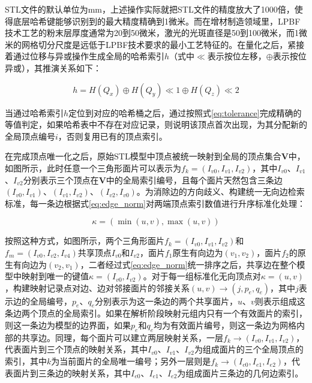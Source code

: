 STL文件的默认单位为$\mathrm{mm}$，上述操作实际就把STL文件的精度放大了\num{1000}倍，使得底层哈希键能够识别到的最大精度精确到1微米。而在增材制造领域里，LPBF技术工艺的粉末层厚度通常为20到\num{50}微米，激光的光斑直径是50到\num{100}微米，而1微米的网格切分尺度是远低于LPBF技术要求的最小工艺特征的。在量化之后，紧接着通过位移与异或操作生成全局的哈希索引$h$（式中$\ll$表示按位左移，$\oplus$表示按位异或），其推演关系如下：

\begin{equation}
h=H(Q_{x})\oplus H(Q_{y})\ll 1\oplus H(Q_{z})\ll 2 \label{eq:hash}
\end{equation}

当通过哈希索引$h$定位到对应的哈希桶之后，通过按照式\eqref{eq:tolerance}完成精确的等值判定，如果哈希表中不存在对应记录，则说明该顶点首次出现，为其分配新的全局顶点编号$i$，否则复用已有的顶点索引。

在完成顶点唯一化之后，原始STL模型中顶点被统一映射到全局的顶点集合$\bm{V}$中，如图所示，此时任意一个三角形面片可以表示为$f_{k}=(I_{v0},I_{v1},I_{v2})$，其中$I_{v0}$、$I_{v1}$、$I_{v2}$分别表示三个顶点在$\bm{V}$中的全局索引编号，且每个面片天然包含三条边$(I_{v0},I_{v1})$、$(I_{v1},I_{v2})$、$(I_{v2},I_{v0})$。为消除边的方向歧义、构建统一无向边检索标准，每一条边根据式\eqref{eq:edge_norm}对两端顶点索引数值进行升序标准化处理：

\begin{equation}
\kappa=(\min(u,v),\max(u,v)) \label{eq:edge_norm}
\end{equation}

按照这种方式，如图所示，两个三角形面片$f_{k}=(I_{v0},I_{v1},I_{v2})$和$f_{m}=(I_{v0},I_{v2},I_{v4})$共享顶点$I_{v0}$和$I_{v2}$，面片$f_{1}$原生有向边为$(v_{1},v_{2})$，面片$f_{2}$的原生有向边为$(v_{2},v_{1})$，二者经过式\eqref{eq:edge_norm}统一排序之后，共享边在整个模型中映射到唯一的键值$\kappa=(I_{v0},I_{v2})$。对于每一组标准化无向顶点对$\kappa=(u,v)$，构建映射记录点对边、边对邻接面片的邻接关系$(u,v)\to(j,p_{e},q_{e})$，其中$j$表示边的全局编号，$p_{e}$、$q_{e}$分别表示为这一条边的两个共享面片，$u$、$v$则表示组成这条边两个顶点的全局索引。如果在解析阶段映射元组内只有一个有效面片的索引，则这一条边为模型的边界面，如果$p_{e}$和$q_{e}$均为有效面片编号，则这一条边为网格内部的共享边。同理，每个面片可以建立两层映射关系，一层$f_{k}\to(I_{v0},I_{v1},I_{v2})$，代表面片到三个顶点的映射关系，其中$I_{v0}$、$I_{v1}$、$I_{v2}$为组成面片的三个全局顶点的索引，其中$k$为当前面片的全局唯一编号；另外一层则是$f_{k}\to(I_{e0},I_{e1},I_{e2})$，代表面片到三条边的映射关系，其中$I_{e0}$、$I_{e1}$、$I_{e2}$为组成面片三条边的几何边索引。

